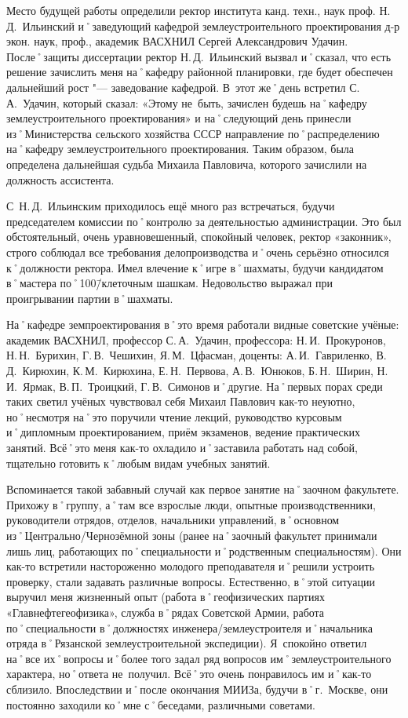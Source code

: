 Место будущей работы определили ректор института канд. техн., наук проф. Н.\,Д.~Ильинский и˚заведующий кафедрой землеустроительного проектирования д-р экон. наук, проф., академик ВАСХНИЛ Сергей Александрович Удачин. После˚защиты диссертации ректор Н.\,Д.~Ильинский вызвал и˚сказал, что есть решение зачислить меня на˚кафедру районной планировки, где будет обеспечен дальнейший рост "--- заведование кафедрой. В~этот же˚день встретил С.\,А.~Удачин, который сказал: «Этому не~быть, зачислен будешь на˚кафедру землеустроительного проектирования» и на˚следующий день принесли из˚Министерства сельского хозяйства СССР направление по˚распределению на˚кафедру землеустроительного проектирования. Таким образом, была определена дальнейшая судьба Михаила Павловича, которого зачислили на должность ассистента. 

С~Н.\,Д.~Ильинским приходилось ещё много раз встречаться, будучи председателем комиссии по˚контролю за  деятельностью администрации. Это был обстоятельный, очень уравновешенный, спокойный человек, ректор «законник», строго соблюдал все требования делопроизводства и˚очень серьёзно относился к˚должности ректора. Имел влечение к˚игре в˚шахматы, будучи кандидатом в˚мастера по˚100\=/клеточным шашкам. Недовольство выражал при проигрывании партии в˚шахматы.

На˚кафедре земпроектирования в˚это время работали видные советские учёные: академик ВАСХНИЛ, профессор С.\,А.~Удачин, профессора: Н.\,И.~Прокуронов, Н.\,Н.~Бурихин, Г.\,В.~Чешихин, Я.\,М.~Цфасман, доценты: А.\,И.~Гавриленко, В.\,Д.~Кирюхин, К.\,М.~Кирюхина, Е.\,Н.~Первова, А.\,В.~Юнюков, Б.\,Н.~Ширин, Н.\,И.~Ярмак, В.\,П.~Троицкий, Г.\,В.~Симонов и˚другие. На˚первых порах среди таких светил учёных чувствовал себя Михаил Павлович как-то неуютно, но˚несмотря на˚это поручили чтение лекций, руководство курсовым и˚дипломным проектированием, приём экзаменов, ведение практических занятий. Всё˚это меня как-то охладило и˚заставила работать над собой, тщательно готовить к˚любым видам учебных занятий.

Вспоминается такой забавный случай как первое занятие на˚заочном факультете. Прихожу в˚группу, а˚там все взрослые люди, опытные производственники, руководители отрядов, отделов, начальники управлений, в˚основном из˚Центрально\-/Чернозёмной зоны (ранее на˚заочный факультет принимали лишь лиц, работающих по˚специальности и˚родственным специальностям). Они как-то встретили настороженно молодого преподавателя и˚решили устроить проверку, стали задавать различные вопросы. Естественно, в˚этой ситуации выручил меня жизненный опыт (работа в˚геофизических партиях «Главнефтегеофизика», служба в˚рядах Советской Армии, работа по˚специальности в˚должностях инженера\-/землеустроителя и˚начальника отряда в˚Рязанской землеустроительной экспедиции). Я~спокойно ответил на˚все их˚вопросы и˚более того задал ряд вопросов им˚землеустроительного характера, но˚ответа не~получил. Всё˚это очень понравилось им и˚как-то сблизило. Впоследствии и˚после окончания МИИЗа, будучи в˚г.~Москве, они постоянно заходили ко˚мне с˚беседами, различными советами. 

